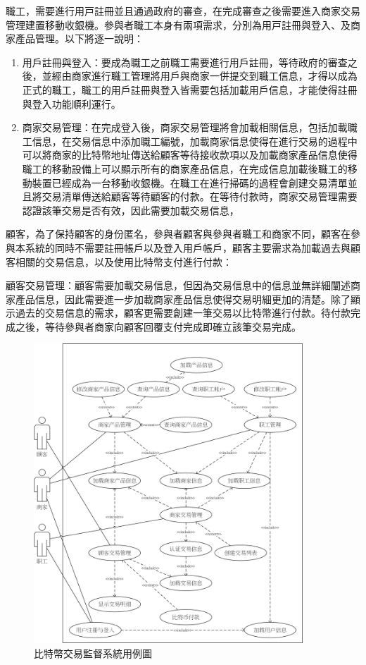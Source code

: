 職⼯，需要進⾏⽤⼾註冊並且通過政府的審查，在完成審查之後需要進⼊商家交易管理建置移動收銀機。參與者職⼯本⾝有兩項需求，分別為⽤⼾註冊與登⼊、及商家產品管理。以下將逐⼀說明：


	\begin{enumerate}
	\item 用戶註冊與登入：要成為職工之前職工需要進行用戶註冊，等待政府的審查之後，並經由商家進行職工管理將用戶與商家一併提交到職工信息，才得以成為正式的職工，職工的用戶註冊與登入皆需要包括加載用戶信息，才能使得註冊與登入功能順利運行。
	\item 商家交易管理：在完成登入後，商家交易管理將會加載相關信息，包括加載職工信息，在交易信息中添加職工編號，加載商家信息使得在進行交易的過程中可以將商家的比特幣地址傳送給顧客等待接收款項以及加載商家產品信息使得職工的移動設備上可以顯示所有的商家產品信息，在完成信息加載後職工的移動裝置已經成為一台移動收銀機。在職工在進行掃碼的過程會創建交易清單並且將交易清單傳送給顧客等待顧客的付款。在等待付款時，商家交易管理需要認證該筆交易是否有效，因此需要加載交易信息，
	\end{enumerate}

顧客，為了保持顧客的身份匿名，參與者顧客與參與者職工和商家不同，顧客在參與本系統的同時不需要註冊帳戶以及登入用戶帳戶，顧客主要需求為加載過去與顧客相關的交易信息，以及使用比特幣支付進行付款：


顧客交易管理：顧客需要加載交易信息，但因為交易信息中的信息並無詳細闡述商家產品信息，因此需要進一步加載商家產品信息使得交易明細更加的清楚。除了顯示過去的交易信息的需求，顧客更需要創建一筆交易以⽐特幣進⾏付款。待付款完成之後，等待參與者商家向顧客回覆⽀付完成即確立該筆交易完成。

	\begin{figure}[!htbp]
	\centering
	\includegraphics[width = 0.9\textwidth]{UC.jpg}
	\caption{比特幣交易監督系統⽤例圖}\label{UC}
	\end{figure}

